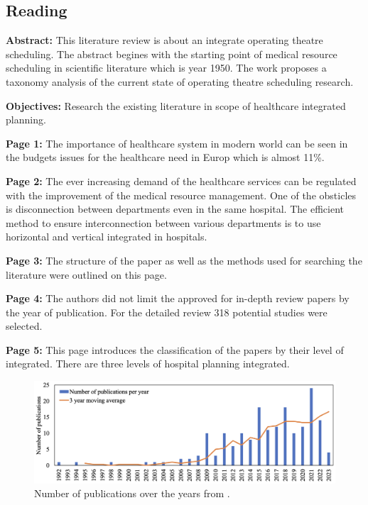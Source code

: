 \subsection{Reading}
    \textbf{Abstract:}
    This literature review is about an integrate operating theatre scheduling. The abstract begines with the starting point of medical resource scheduling in scientific literature which is year 1950. The work proposes a taxonomy analysis of the current state of operating theatre scheduling research.
    
    \textbf{Objectives:}
    Research the existing literature in scope of healthcare integrated planning.

    
    \textbf{Page 1:}
    The importance of healthcare system in modern world can be seen in the budgets issues for the healthcare need in Europ which is almost 11\%.
    
    \textbf{Page 2:}
    The ever increasing demand of the healthcare services can be regulated with the improvement of the medical resource management. One of the obsticles is disconnection between departments even in the same hospital. The efficient method to ensure interconnection between various departments is to use horizontal and vertical integrated in hospitals.
    
    \textbf{Page 3:}
    The structure of the paper as well as the methods used for searching the literature were outlined on this page.
    
    \textbf{Page 4:}
    The authors did not limit the approved for in-depth review papers by the year of publication. For the detailed review 318 potential studies were selected.
    
    \textbf{Page 5:}
    This page introduces the classification of the papers by their level of integrated. There are three levels of hospital planning integrated.
    \begin{figure}[H]
        \centering
        \includegraphics[width=1\textwidth]{figures/0010_SR02NL23/fig1.png}
        \caption{Number of publications over the years from \cite{x338}.}
        \label{fig1:0010_SR02NL23}
    \end{figure}
    
